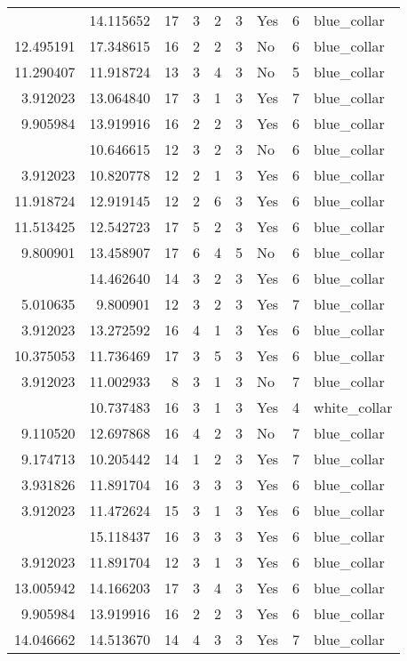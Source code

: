 \documentclass[
]{article}
\begin{document}
\begin{longtable}[t]{rrrrrllrl}
\addlinespace
13.304768 & 14.115652 & 17 & 3 & 2 & 3 & Yes & 6 & blue\_collar\\
12.495191 & 17.348615 & 16 & 2 & 2 & 3 & No & 6 & blue\_collar\\
11.290407 & 11.918724 & 13 & 3 & 4 & 3 & No & 5 & blue\_collar\\
3.912023 & 13.064840 & 17 & 3 & 1 & 3 & Yes & 7 & blue\_collar\\
9.905984 & 13.919916 & 16 & 2 & 2 & 3 & Yes & 6 & blue\_collar\\
\addlinespace
5.298317 & 10.646615 & 12 & 3 & 2 & 3 & No & 6 & blue\_collar\\
3.912023 & 10.820778 & 12 & 2 & 1 & 3 & Yes & 6 & blue\_collar\\
11.918724 & 12.919145 & 12 & 2 & 6 & 3 & Yes & 6 & blue\_collar\\
11.513425 & 12.542723 & 17 & 5 & 2 & 3 & Yes & 6 & blue\_collar\\
9.800901 & 13.458907 & 17 & 6 & 4 & 5 & No & 6 & blue\_collar\\
\addlinespace
11.002933 & 14.462640 & 14 & 3 & 2 & 3 & Yes & 6 & blue\_collar\\
5.010635 & 9.800901 & 12 & 3 & 2 & 3 & Yes & 7 & blue\_collar\\
3.912023 & 13.272592 & 16 & 4 & 1 & 3 & Yes & 6 & blue\_collar\\
10.375053 & 11.736469 & 17 & 3 & 5 & 3 & Yes & 6 & blue\_collar\\
3.912023 & 11.002933 & 8 & 3 & 1 & 3 & No & 7 & blue\_collar\\
\addlinespace
3.912023 & 10.737483 & 16 & 3 & 1 & 3 & Yes & 4 & white\_collar\\
9.110520 & 12.697868 & 16 & 4 & 2 & 3 & No & 7 & blue\_collar\\
9.174713 & 10.205442 & 14 & 1 & 2 & 3 & Yes & 7 & blue\_collar\\
3.931826 & 11.891704 & 16 & 3 & 3 & 3 & Yes & 6 & blue\_collar\\
3.912023 & 11.472624 & 15 & 3 & 1 & 3 & Yes & 6 & blue\_collar\\
\addlinespace
9.215328 & 15.118437 & 16 & 3 & 3 & 3 & Yes & 6 & blue\_collar\\
3.912023 & 11.891704 & 12 & 3 & 1 & 3 & Yes & 6 & blue\_collar\\
13.005942 & 14.166203 & 17 & 3 & 4 & 3 & Yes & 6 & blue\_collar\\
9.905984 & 13.919916 & 16 & 2 & 2 & 3 & Yes & 6 & blue\_collar\\
14.046662 & 14.513670 & 14 & 4 & 3 & 3 & Yes & 7 & blue\_collar\\

\end{longtable}
\end{document}
